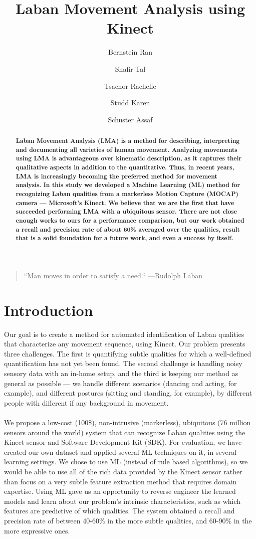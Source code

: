 \documentclass[11pt,twocolumn,varwidth=true,a4paper,fleqn]{article}
\author[1]{Bernstein Ran}
\author[2]{Shafir Tal}
\author[3]{Tsachor Rachelle}
\author[4]{Studd Karen}
\author[1]{Schuster Assaf}
\affil[1]{Department of Computer Science, Technion I.I.T, Haifa, Israel}
\affil[2]{The Graduate School of Creative Arts Therapies, University of Haifa}
\affil[3]{School of Theatre \& Music, The University of Illinois at Chicago}
\affil[4]{School of Dance, George Mason University}
\begin{document}
\nocite{*}

\title{Laban Movement Analysis using Kinect}
\date{}
\maketitle
\begin{quote}{``Man moves in order to satisfy a need.`` ---\textup{Rudolph Laban}}
\end{quote}
\begin{abstract}
\textbf{Laban Movement Analysis (LMA) is a method for describing, interpreting
and documenting all varieties of human movement. 
Analyzing movements using LMA is advantageous over kinematic description, 
as it captures their qualitative aspects in addition to the quantitative. 
Thus, in recent years, LMA is increasingly becoming the preferred method for movement analysis. 
In this study we developed a Machine Learning (ML) method for recognizing Laban qualities from 
a markerless Motion Capture (MOCAP) camera --- Microsoft's Kinect. 
We believe that we are the first that have succeeded performing LMA with a ubiquitous sensor. 
There are not close enough works to ours for a performance comparison, 
but our work obtained a recall and precision rate of about 60\%  averaged over
the qualities, result that is a solid foundation for a future work, and even a
success by itself.}
\end{abstract}
\section{Introduction}
Our goal is to create a method for automated identification of Laban qualities that characterize any movement sequence,
using Kinect. Our problem presents three challenges. The first is
quantifying subtle qualities for which a well-defined quantification has not yet been found. The second challenge is handling noisy sensory data with an in-home setup, and the
third is keeping our method as general as possible --- we handle
different scenarios (dancing and acting, for example), and different postures
(sitting and standing, for example), by different people with different
if any background in movement. 
\\\\We propose a low-cost (100\$), non-intrusive
(markerless), ubiquitous (76 million sensors around the world) system that can recognize Laban qualities using the Kinect sensor and Software Development Kit (SDK).
For evaluation, we have created our own dataset and applied several ML
techniques on it, in several learning settings. We chose to use ML (instead of rule based algorithms), so 
we would be able to use all of the rich data provided by the Kinect sensor rather than focus on a very 
subtle feature extraction method that requires domain expertise. Using ML gave us
an opportunity to reverse engineer the learned models and learn about
our problem's intrinsic characteristics, such as which features are predictive
of which qualities. The system obtained a recall and precision rate of between
40-60\% in the more subtle qualities, and 60-90\% in the more expressive ones.
\end{document}
